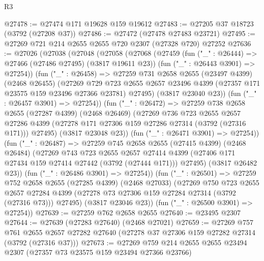 \begin{lexlean}{R3}
\begin{coremodule}
@27478 := @27474 @171 @19628 @159 @19612
@27483 := @27205 @37 @18723 (@3792 (@27208 @37))
@27486 := @27472 (@27478 @27483 @23721)
@27495 := @27269 @721 @214 @2655 @2655 @720 @2307 (@27328 @720) @27252
@27636 := @27026
    (@27038
      (@27048
        (@27058
          (@27068
            (@27459
              (fun ("_" : @26444) => @27466 (@27486 @27495) (@3817 @19611 @23))
              (fun ("_" : @26443 @3901) => @27254))
            (fun ("_" : @26458) =>
            @27259
              @731
              @2658
              @2655
              (@23497 @4399)
              (@2468 @26455)
              (@27269
                @729
                @723
                @2655
                @2657
                @23496
                @4399
                (@27357 @171 @23575 @159 @23496 @27366 @23781)
                @27495)
              (@3817 @23040 @23))
            (fun ("_" : @26457 @3901) => @27254))
          (fun ("_" : @26472) =>
          @27259
            @738
            @2658
            @2655
            (@27287 @4399)
            (@2468 @26469)
            (@27269
              @736
              @723
              @2655
              @2657
              @27286
              @4399
              (@27278 @171 @27306 @159 @27286 @27314 (@3792 (@27316 @171)))
              @27495)
            (@3817 @23048 @23))
          (fun ("_" : @26471 @3901) => @27254))
        (fun ("_" : @26487) =>
        @27259
          @745
          @2658
          @2655
          (@27415 @4399)
          (@2468 @26484)
          (@27269
            @743
            @723
            @2655
            @2657
            @27414
            @4399
            (@27406 @171 @27434 @159 @27414 @27442 (@3792 (@27444 @171)))
            @27495)
          (@3817 @26482 @23))
        (fun ("_" : @26486 @3901) => @27254))
      (fun ("_" : @26501) =>
      @27259
        @752
        @2658
        @2655
        (@27285 @4399)
        (@2468 @27033)
        (@27269
          @750
          @723
          @2655
          @2657
          @27284
          @4399
          (@27278 @73 @27306 @159 @27284 @27314 (@3792 (@27316 @73)))
          @27495)
        (@3817 @23046 @23))
      (fun ("_" : @26500 @3901) => @27254))
@27639 := @27259 @762 @2658 @2655
@27640 := @23495 @2307
@27644 := @27639 (@27283 @27640) (@2468 @27021)
@27659 := @27269
    @757
    @761
    @2655
    @2657
    @27282
    @27640
    (@27278 @37 @27306 @159 @27282 @27314 (@3792 (@27316 @37)))
@27673 := @27269
    @759
    @214
    @2655
    @2655
    @23494
    @2307
    (@27357 @73 @23575 @159 @23494 @27366 @23766)

\end{coremodule}
\end{lexlean}
